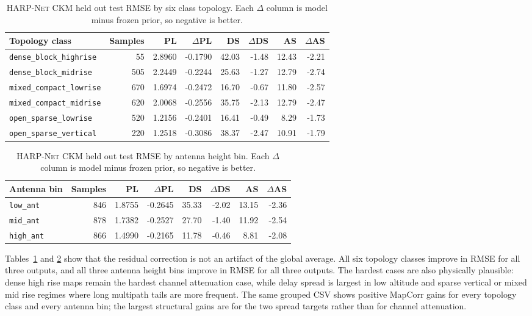 \begin{table}[!htbp]
\centering
\caption[\textsc{HARP-Net CKM} held out test RMSE by topology.]%
{\textsc{HARP-Net CKM} held out test RMSE by six class topology. Each
\(\Delta\) column is model minus frozen prior, so negative is better.}
\label{tab:try80_final_test_topology}
\scriptsize
\begin{tabularx}{\textwidth}{>{\raggedright\arraybackslash}Xrrrrrrr}
\toprule
Topology class & Samples & PL & \(\Delta\)PL & DS & \(\Delta\)DS & AS & \(\Delta\)AS \\
\midrule
\texttt{dense\_block\_highrise} & 55 & 2.8960 & -0.1790 & 42.03 & -1.48 & 12.43 & -2.21 \\
\texttt{dense\_block\_midrise} & 505 & 2.2449 & -0.2244 & 25.63 & -1.27 & 12.79 & -2.74 \\
\texttt{mixed\_compact\_lowrise} & 670 & 1.6974 & -0.2472 & 16.70 & -0.67 & 11.80 & -2.57 \\
\texttt{mixed\_compact\_midrise} & 620 & 2.0068 & -0.2556 & 35.75 & -2.13 & 12.79 & -2.47 \\
\texttt{open\_sparse\_lowrise} & 520 & 1.2156 & -0.2401 & 16.41 & -0.49 & 8.29 & -1.73 \\
\texttt{open\_sparse\_vertical} & 220 & 1.2518 & -0.3086 & 38.37 & -2.47 & 10.91 & -1.79 \\
\bottomrule
\end{tabularx}
\end{table}

\begin{table}[!htbp]
\centering
\caption[\textsc{HARP-Net CKM} held out test RMSE by antenna height bin.]%
{\textsc{HARP-Net CKM} held out test RMSE by antenna height bin. Each
\(\Delta\) column is model minus frozen prior, so negative is better.}
\label{tab:try80_final_test_antenna}
\scriptsize
\begin{tabular}{lrrrrrrr}
\toprule
Antenna bin & Samples & PL & \(\Delta\)PL & DS & \(\Delta\)DS & AS & \(\Delta\)AS \\
\midrule
\texttt{low\_ant} & 846 & 1.8755 & -0.2645 & 35.33 & -2.02 & 13.15 & -2.36 \\
\texttt{mid\_ant} & 878 & 1.7382 & -0.2527 & 27.70 & -1.40 & 11.92 & -2.54 \\
\texttt{high\_ant} & 866 & 1.4990 & -0.2165 & 11.78 & -0.46 & 8.81 & -2.08 \\
\bottomrule
\end{tabular}
\end{table}

Tables~\ref{tab:try80_final_test_topology} and
\ref{tab:try80_final_test_antenna} show that the residual correction is not an
artifact of the global average. All six topology classes improve in RMSE for
all three outputs, and all three antenna height bins improve in RMSE for all
three outputs. The hardest cases are also physically plausible: dense high rise
maps remain the hardest channel attenuation case, while delay spread is largest
in low altitude and sparse vertical or mixed mid rise regimes where long
multipath tails are more frequent. The same grouped CSV shows positive
MapCorr gains for every topology class and every antenna bin; the largest
structural gains are for the two spread targets rather than for channel
attenuation.

